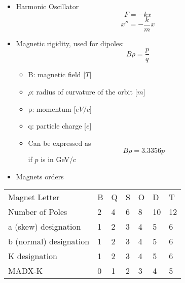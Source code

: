 \begin{itemize}
\item
  Harmonic Oscillator \[F = -kx\] \[x'' = -\frac{k}{m}x \]
\item
  Magnetic rigidity, used for dipoles: \[B\rho = \frac{p}{q}\]

  \begin{itemize}
  \item
    B: magnetic field {[}\(T\){]}
  \item
    \(\rho\): radius of curvature of the orbit {[}\(m\){]}
  \item
    p: momentum {[}\(eV/c\){]}
  \item
    q: particle charge {[}\(e\){]}
  \item
    Can be expressed as \[B \rho = 3.3356 p\] if \(p\) is in GeV/c
  \end{itemize}
\item
  Magnets orders
\end{itemize}

\begin{center}
  \begin{tabular}{lllllll}
  Magnet Letter          & B & Q & S & O & D & T \\
  Number of Poles        & 2 & 4 & 6 & 8 & 10 & 12 \\
  a (skew) designation   & 1 & 2 & 3 & 4 & 5 & 6 \\
  b (normal) designation & 1 & 2 & 3 & 4 & 5 & 6 \\
  K designation          & 1 & 2 & 3 & 4 & 5 & 6 \\
  MADX-K                 & 0 & 1 & 2 & 3 & 4 & 5 \\
  \end{tabular}
\end{center}

